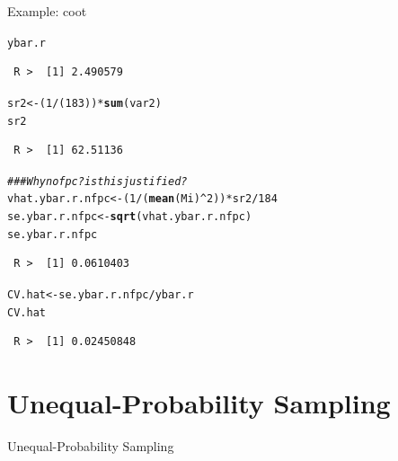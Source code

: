 \documentclass[10pt]{beamer}\usepackage[]{graphicx}\usepackage[]{xcolor}
\makeatletter
\newcommand{\hlnum}[1]{\textcolor[rgb]{0.686,0.059,0.569}{#1}}%
\newcommand{\hlcom}[1]{\textcolor[rgb]{0.678,0.584,0.686}{\textit{#1}}}%
\newcommand{\hlopt}[1]{\textcolor[rgb]{0,0,0}{#1}}%
\newcommand{\hlstd}[1]{\textcolor[rgb]{0.345,0.345,0.345}{#1}}%
\newcommand{\hlkwb}[1]{\textcolor[rgb]{0.69,0.353,0.396}{#1}}%
\newcommand{\hlkwd}[1]{\textcolor[rgb]{0.737,0.353,0.396}{\textbf{#1}}}%
\newenvironment{kframe}{%
 \def\at@end@of@kframe{}%
 \ifinner\ifhmode%
  \def\at@end@of@kframe{\end{minipage}}%
  \begin{minipage}{\columnwidth}%
 \fi\fi%
 \def\FrameCommand##1{\hskip\@totalleftmargin \hskip-\fboxsep
 \colorbox{shadecolor}{##1}\hskip-\fboxsep
     \hskip-\linewidth \hskip-\@totalleftmargin \hskip\columnwidth}%
 \MakeFramed {\advance\hsize-\width
   \@totalleftmargin\z@ \linewidth\hsize
   \@setminipage}}%
 {\par\unskip\endMakeFramed%
 \at@end@of@kframe}
\newenvironment{knitrout}{}{} %
\makeatother
\begin{document}
\begin{frame}[containsverbatim]{Example: coot}
\tiny
\begin{knitrout}
\color{fgcolor}\begin{kframe}
\begin{alltt}
\hlstd{ybar.r}
\end{alltt}
\begin{verbatim}
 R >  [1] 2.490579
\end{verbatim}
\begin{alltt}
\hlstd{sr2} \hlkwb{<-} \hlstd{(}\hlnum{1}\hlopt{/}\hlstd{(}\hlnum{183}\hlstd{))} \hlopt{*} \hlkwd{sum}\hlstd{(var2)}
\hlstd{sr2}
\end{alltt}
\begin{verbatim}
 R >  [1] 62.51136
\end{verbatim}
\begin{alltt}
\hlcom{### Why no fpc? is this justified?}
\hlstd{vhat.ybar.r.nfpc} \hlkwb{<-} \hlstd{(}\hlnum{1}\hlopt{/}\hlstd{(}\hlkwd{mean}\hlstd{(Mi)}\hlopt{^}\hlnum{2}\hlstd{))} \hlopt{*} \hlstd{sr2}\hlopt{/}\hlnum{184}
\hlstd{se.ybar.r.nfpc} \hlkwb{<-} \hlkwd{sqrt}\hlstd{(vhat.ybar.r.nfpc)}
\hlstd{se.ybar.r.nfpc}
\end{alltt}
\begin{verbatim}
 R >  [1] 0.0610403
\end{verbatim}
\begin{alltt}
\hlstd{CV.hat} \hlkwb{<-} \hlstd{se.ybar.r.nfpc}\hlopt{/}\hlstd{ybar.r}
\hlstd{CV.hat}
\end{alltt}
\begin{verbatim}
 R >  [1] 0.02450848
\end{verbatim}
\end{kframe}
\end{knitrout}
\end{frame}

\section{Unequal-Probability Sampling}
\begin{frame}{}
\begin{block}{}
Unequal-Probability Sampling
\end{block}
\end{frame}
\end{document}
